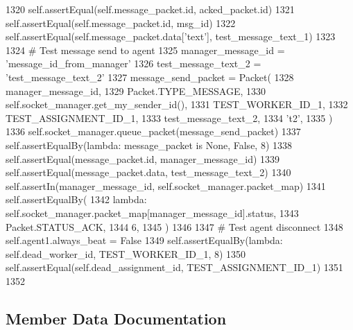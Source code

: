\begin{DoxyCode}
1320         self.assertEqual(self.message\_packet.id, acked\_packet.id)
1321         self.assertEqual(self.message\_packet.id, msg\_id)
1322         self.assertEqual(self.message\_packet.data[\textcolor{stringliteral}{'text'}], test\_message\_text\_1)
1323 
1324         \textcolor{comment}{# Test message send to agent}
1325         manager\_message\_id = \textcolor{stringliteral}{'message\_id\_from\_manager'}
1326         test\_message\_text\_2 = \textcolor{stringliteral}{'test\_message\_text\_2'}
1327         message\_send\_packet = Packet(
1328             manager\_message\_id,
1329             Packet.TYPE\_MESSAGE,
1330             self.socket\_manager.get\_my\_sender\_id(),
1331             TEST\_WORKER\_ID\_1,
1332             TEST\_ASSIGNMENT\_ID\_1,
1333             test\_message\_text\_2,
1334             \textcolor{stringliteral}{'t2'},
1335         )
1336         self.socket\_manager.queue\_packet(message\_send\_packet)
1337         self.assertEqualBy(\textcolor{keyword}{lambda}: message\_packet \textcolor{keywordflow}{is} \textcolor{keywordtype}{None}, \textcolor{keyword}{False}, 8)
1338         self.assertEqual(message\_packet.id, manager\_message\_id)
1339         self.assertEqual(message\_packet.data, test\_message\_text\_2)
1340         self.assertIn(manager\_message\_id, self.socket\_manager.packet\_map)
1341         self.assertEqualBy(
1342             \textcolor{keyword}{lambda}: self.socket\_manager.packet\_map[manager\_message\_id].status,
1343             Packet.STATUS\_ACK,
1344             6,
1345         )
1346 
1347         \textcolor{comment}{# Test agent disconnect}
1348         self.agent1.always\_beat = \textcolor{keyword}{False}
1349         self.assertEqualBy(\textcolor{keyword}{lambda}: self.dead\_worker\_id, TEST\_WORKER\_ID\_1, 8)
1350         self.assertEqual(self.dead\_assignment\_id, TEST\_ASSIGNMENT\_ID\_1)
1351 
1352 
\end{DoxyCode}


\subsection{Member Data Documentation}
\mbox{\label{classparlai_1_1mturk_1_1core_1_1legacy__2018_1_1test_1_1test__socket__manager_1_1TestSocketManagerMessageHandling_a232b4451e7ac196962e6c3bb2b27b7b0}} 

